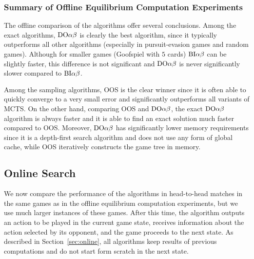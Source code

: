 \subsubsection{Summary of Offline Equilibrium Computation Experiments}

The offline comparison of the algorithms offer several conclusions.
Among the exact algorithms, $\textrm{DO}\alpha\beta$ is clearly the best algorithm, since it typically outperforms all other algorithms (especially in pursuit-evasion games and random games). Although for smaller games (\eg Goofspiel with $5$ cards)  $\textrm{BI}\alpha\beta$ can be slightly faster, this difference is not significant and $\textrm{DO}\alpha\beta$ is never significantly slower compared to $\textrm{BI}\alpha\beta$. 

Among the sampling algorithms, OOS is the clear winner since it is often able to quickly converge to a very small error and significantly outperforms all variants of MCTS.
On the other hand, comparing OOS and $\textrm{DO}\alpha\beta$, the exact $\textrm{DO}\alpha\beta$ algorithm is always faster and it is able to find an exact solution much faster compared to OOS.
Moreover, $\textrm{DO}\alpha\beta$ has significantly lower memory requirements since it is a depth-first search algorithm and does not use any form of global cache, while OOS iteratively constructs the game tree in memory.

\subsection{Online Search}

We now compare the performance of the algorithms in head-to-head matches in the same games as in the offline equilibrium computation experiments, but we use much larger instances of these games.  After this time, the algorithm outputs an action to be played in the current game state, receives information about the action selected by its opponent, and the game proceeds to the next state. As described in Section~\ref{sec:online}, all algorithms keep results of previous computations and do not start form scratch in the next state. 

